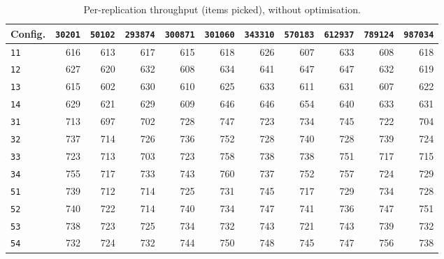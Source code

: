 \begin{table}[htb]
\centering
\small
\caption{Per-replication throughput (items picked), without optimisation.}
\label{tab:app_throughput_opt_false}
\begin{tabular}{@{}lrrrrrrrrrr@{}}
\toprule
\textbf{Config.} & \texttt{30201} & \texttt{50102} & \texttt{293874} & \texttt{300871} & \texttt{301060} & \texttt{343310} & \texttt{570183} & \texttt{612937} & \texttt{789124} & \texttt{987034} \\
\midrule
\texttt{11} & 616 & 613 & 617 & 615 & 618 & 626 & 607 & 633 & 608 & 618 \\
\texttt{12} & 627 & 620 & 632 & 608 & 634 & 641 & 647 & 647 & 632 & 619 \\
\texttt{13} & 615 & 602 & 630 & 610 & 625 & 633 & 611 & 631 & 607 & 622 \\
\texttt{14} & 629 & 621 & 629 & 609 & 646 & 646 & 654 & 640 & 633 & 631 \\
\texttt{31} & 713 & 697 & 702 & 728 & 747 & 723 & 734 & 745 & 722 & 704 \\
\texttt{32} & 737 & 714 & 726 & 736 & 752 & 728 & 740 & 728 & 739 & 724 \\
\texttt{33} & 723 & 713 & 703 & 723 & 758 & 738 & 738 & 751 & 717 & 715 \\
\texttt{34} & 755 & 717 & 733 & 743 & 760 & 737 & 752 & 757 & 724 & 729 \\
\texttt{51} & 739 & 712 & 714 & 725 & 731 & 745 & 717 & 729 & 734 & 728 \\
\texttt{52} & 740 & 722 & 714 & 740 & 734 & 747 & 741 & 736 & 747 & 751 \\
\texttt{53} & 738 & 723 & 725 & 734 & 732 & 743 & 721 & 743 & 739 & 732 \\
\texttt{54} & 732 & 724 & 732 & 744 & 750 & 748 & 745 & 747 & 756 & 738 \\
\bottomrule
\end{tabular}
\end{table}
